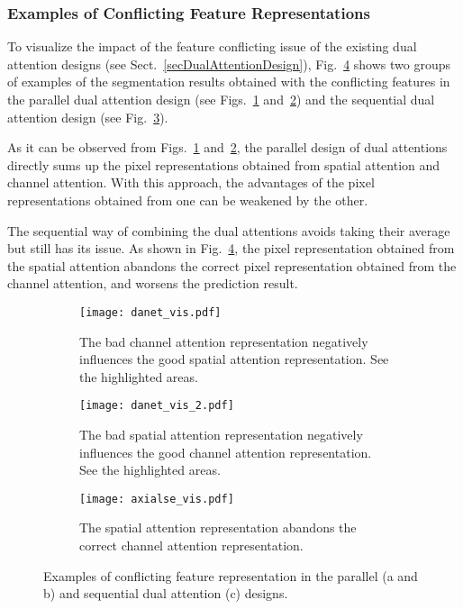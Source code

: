 \documentclass[journal]{IEEEtran}
\begin{document}
\subsubsection{Examples of Conflicting Feature Representations}

To visualize the impact of the feature conflicting issue of the existing dual attention designs (see Sect.~\ref{secDualAttentionDesign}), 
Fig.~\ref{faxialse_se_sa} shows two groups of examples of the segmentation results obtained with the conflicting features in the parallel dual attention design (see Figs.~\ref{fdanet_pam_cam} and~\ref{fdanet_cam_pam}) and the sequential dual attention design (see Fig.~\ref{fig:five over x}). 

As it can be observed from Figs.~\ref{fdanet_pam_cam} and~\ref{fdanet_cam_pam}, the parallel design of dual attentions directly sums up the pixel representations obtained from spatial attention and channel attention. 
With this approach, the advantages of the pixel representations obtained from one can be weakened by the other. 

The sequential way of combining the dual attentions avoids taking their average but still has its issue. 
As shown in Fig.~\ref{faxialse_se_sa}, the pixel representation obtained from the spatial attention abandons the correct pixel representation obtained from the channel attention, and worsens the prediction result.\\



\begin{figure}[t]
     \centering
     \begin{subfigure}[t]{0.48\textwidth}
         \centering
         \texttt{[image: danet\_vis.pdf]}
         \caption{The bad channel attention representation negatively influences the good spatial attention representation. See the highlighted areas.}
         \label{fdanet_pam_cam}
     \end{subfigure}
     \hfill
     \begin{subfigure}[t]{0.48\textwidth}
         \centering
         \texttt{[image: danet\_vis\_2.pdf]}
         \caption{The bad spatial attention representation negatively influences the good channel attention representation. See the highlighted areas.}
         \label{fdanet_cam_pam}
     \end{subfigure}
     \hfill
     \begin{subfigure}[t]{0.45\textwidth}
         \centering
         \texttt{[image: axialse\_vis.pdf]}
         \caption{The spatial attention representation abandons the correct channel attention representation.}
         \label{fig:five over x}
     \end{subfigure}
        \caption{Examples of conflicting feature representation in the parallel (a and b) and sequential dual attention (c) designs.}
        \label{faxialse_se_sa}
\end{figure}
\end{document}
